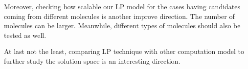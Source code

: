 Moreover, checking how scalable our LP model for the cases having candidates coming from different molecules is another improve direction. The number of molecules can be larger. Meanwhile, different types of molecules should also be tested as well.

At last not the least, comparing LP technique with other computation model to further study the solution space is an interesting direction. 










